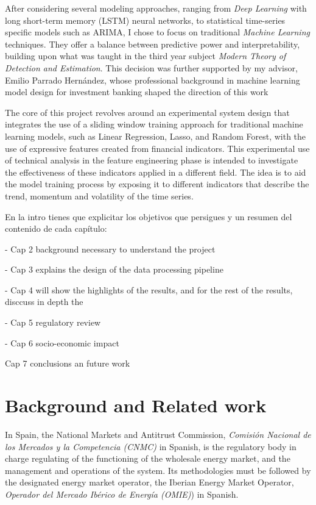 \documentclass[12pt]{report} %
\begin{document}
After considering several modeling approaches, ranging from \textit{Deep Learning} with long short-term memory (LSTM) neural networks, to statistical time-series specific models such as ARIMA, I chose to focus on traditional \textit{Machine Learning} techniques. They offer a balance between predictive power and interpretability, building upon what was taught in the third year subject \textit{Modern Theory of Detection and Estimation}. This decision was further supported by my advisor, Emilio Parrado Hernández, whose professional background in machine learning model design for investment banking shaped the direction of this work

The core of this project revolves around an experimental system design that integrates the use of a sliding window training approach for traditional machine learning models, such as Linear Regression, Lasso, and Random Forest, with the use of expressive features created from financial indicators. This experimental use of technical analysis in the feature engineering phase is intended to investigate the effectiveness of these indicators applied in a different field. The idea is to aid the model training process by exposing it to different indicators that describe the trend, momentum and volatility of the time series.

En la intro tienes que explicitar los objetivos que persigues y un resumen del contenido de cada capítulo:

- Cap 2 background necessary to understand the project

- Cap 3 explains the design of the data processing pipeline

- Cap 4 will show the highlights of the results, and for the rest of the results, disccuss in depth the

- Cap 5 regulatory review

- Cap 6 socio-economic impact

Cap 7 conclusions an future work



\chapter{Background and Related work}
In Spain, the National Markets and Antitrust Commission, \textit{Comisión Nacional de los Mercados y la Competencia (CNMC)} in Spanish, is the regulatory body in charge regulating of the functioning of the wholesale energy market, and the management and operations of the system. \cite{boe_cnmc_BOE-A-2019-17287} Its methodologies must be followed by the designated energy market operator, the Iberian Energy Market Operator, \textit{Operador del Mercado Ibérico de Energía (OMIE)}) in Spanish.
\end{document}
